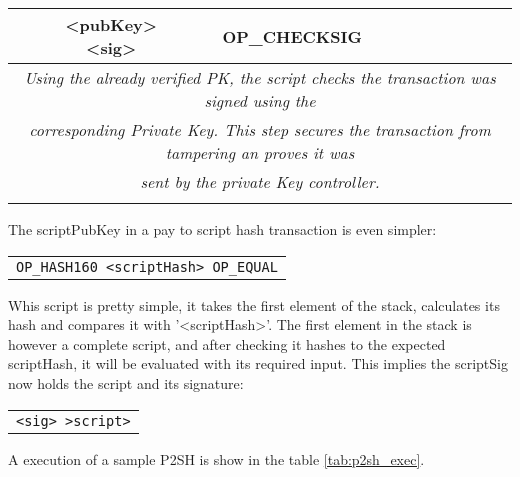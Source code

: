 \begin{table}[]
\begin{tabularx}{\textwidth}{| c | X |}
			\hline
			\makecell{<pubKey> \\ <sig>} & OP\_CHECKSIG \\
			\hline
			\multicolumn{2}{|c|}{\textit{Using the already verified PK, the script checks the transaction was signed using the}} \\
			\multicolumn{2}{|c|}{\textit{corresponding Private Key. This step secures the transaction from tampering an proves it was}} \\
			\multicolumn{2}{|c|}{\textit{sent by the private Key controller.}} \\
			\hline
			\makecell{True} & \\
			\hline
		\end{tabularx}
	\end{table}

The scriptPubKey in a pay to script hash transaction is even simpler:
\begin{center}
	\begin{tabular}{|c|}
		\texttt{OP\_HASH160 <scriptHash> OP\_EQUAL}
	\end{tabular}
\end{center}
Whis script is pretty simple, it takes the first element of the stack,
  calculates its hash and compares it with '<scriptHash>'. The first
  element in the stack is however a complete script, and after checking
  it hashes to the expected scriptHash, it will be evaluated with its
  required input. This implies the scriptSig now holds the script and
  its signature:

\begin{center}
	\begin{tabular}{|c|}
		\texttt{<sig> >script>}
	\end{tabular}
\end{center}


  A execution of a sample P2SH is show in the table \ref{tab:p2sh_exec}.

